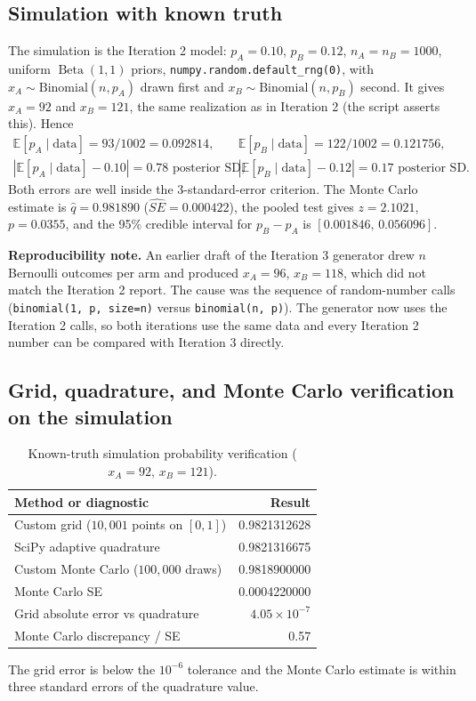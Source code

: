 \documentclass[11pt]{article}
\newcommand{\E}{\mathbb{E}}
\newcommand{\Beta}{\operatorname{Beta}}
\begin{document}
\subsection{Simulation with known truth}
The simulation is the Iteration 2 model: $p_A=0.10$, $p_B=0.12$, $n_A=n_B=1000$, uniform $\Beta(1,1)$ priors, \texttt{numpy.random.default\_rng(0)}, with $x_A\sim\mathrm{Binomial}(n,p_A)$ drawn first and $x_B\sim\mathrm{Binomial}(n,p_B)$ second. It gives $x_A=92$ and $x_B=121$, the same realization as in Iteration 2 (the script asserts this). Hence
\[
\begin{array}{ll}
\E[p_A\mid\mathrm{data}]=93/1002=0.092814,&
\E[p_B\mid\mathrm{data}]=122/1002=0.121756,\\
|\E[p_A\mid\mathrm{data}]-0.10|=0.78\text{ posterior SD},&
|\E[p_B\mid\mathrm{data}]-0.12|=0.17\text{ posterior SD}.
\end{array}
\]
Both errors are well inside the 3-standard-error criterion. The Monte Carlo estimate is $\hat q=0.981890$ ($\widehat{SE}=0.000422$), the pooled test gives $z=2.1021$, $p=0.0355$, and the 95\% credible interval for $p_B-p_A$ is $[0.001846,\,0.056096]$.

\textbf{Reproducibility note.} An earlier draft of the Iteration 3 generator drew $n$ Bernoulli outcomes per arm and produced $x_A=96$, $x_B=118$, which did not match the Iteration 2 report. The cause was the sequence of random-number calls (\texttt{binomial(1, p, size=n)} versus \texttt{binomial(n, p)}). The generator now uses the Iteration 2 calls, so both iterations use the same data and every Iteration 2 number can be compared with Iteration 3 directly.

\subsection{Grid, quadrature, and Monte Carlo verification on the simulation}
\begin{table}[H]\centering
\caption{Known-truth simulation probability verification ($x_A=92$, $x_B=121$).}
\begin{tabular}{lr}\toprule
Method or diagnostic & Result\\\midrule
Custom grid ($10{,}001$ points on $[0,1]$) & 0.9821312628\\
SciPy adaptive quadrature & 0.9821316675\\
Custom Monte Carlo ($100{,}000$ draws) & 0.9818900000\\
Monte Carlo SE & 0.0004220000\\
Grid absolute error vs quadrature & $4.05\times10^{-7}$\\
Monte Carlo discrepancy / SE & 0.57\\\bottomrule
\end{tabular}
\end{table}
The grid error is below the $10^{-6}$ tolerance and the Monte Carlo estimate is within three standard errors of the quadrature value.
\end{document}
